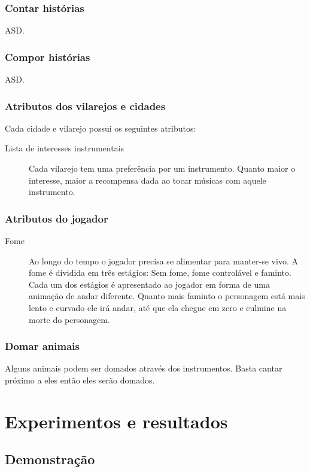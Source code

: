 \documentclass[12pt, 
openright, 
oneside, 
a4paper,    
brazil]{facom-ufu-abntex2}
\begin{document}
\subsection{Contar histórias}
ASD.
\subsection{Compor histórias}
ASD.
\subsection{Atributos dos vilarejos e cidades}
Cada cidade e vilarejo possui os seguintes atributos:
\begin{description}  
\item [Lista de interesses instrumentais] Cada vilarejo tem uma preferência por um instrumento. Quanto maior o interesse, maior a recompensa dada ao tocar músicas com aquele instrumento.
\end{description}

\subsection{Atributos do jogador}
\begin{description}  
\item [Fome] Ao longo do tempo o jogador precisa se alimentar para manter-se vivo. A fome é dividida em três estágios: Sem fome, fome controlável e faminto. Cada um dos estágios é
apresentado ao jogador em forma de uma animação de andar diferente. Quanto mais faminto o personagem está mais lento e curvado ele irá andar, até que ela chegue em zero e culmine na morte do personagem.
\end{description}

\subsection{Domar animais}
Alguns animais podem ser domados através dos instrumentos. Basta cantar próximo a eles então eles serão domados.
\fi


\chapter{Experimentos e resultados}
\label{sec:experim}

\section{Demonstração}
\end{document}
